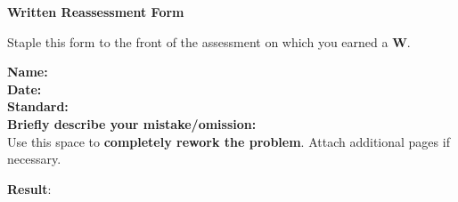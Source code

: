 \documentclass[letterpaper]{article}
\begin{document}
\begin{center}
{\Large \bf Written Reassessment Form} \\
\large \course
\end{center}


Staple this form to the front of the assessment on which you earned a {\bf W}.	
\vspace{0.2in}

\begin{flushleft}
{\bf Name: } \underline{\phantom{xxxxxxxxxxxxxxxxxxxxxxxxxxxxxxxxxxxxxxxxxxxxxxxxxxxxxxxxx}} \\
\vspace{0.15in}
{\bf Date: } \underline{\phantom{xxxxxxxxxxxxxxxxxxxxxxxxxxxxxxxxxxxxxxxxxxxxxxxxxxxxxxxxx}} \\
\vspace{0.15in}
{\bf Standard: } \underline{\phantom{xxxxxxxxxxxxxxxxxxx}} \\
\vspace{0.15in}
{\bf Briefly describe your mistake/omission: } \\
\vspace{0.6in}
Use this space to {\bf completely rework the problem}.  Attach additional pages if necessary.

\vfill

\hfill {\bf Result}: \fbox{\rule{0.5in}{0pt}\rule[-0.5ex]{0pt}{4ex}}

\end{flushleft}
\end{document}
